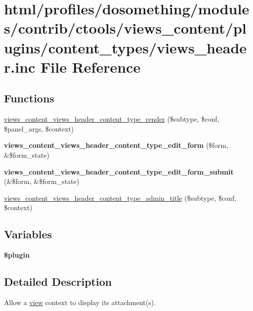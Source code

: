 \hypertarget{views__header_8inc}{
\section{html/profiles/dosomething/modules/contrib/ctools/views\_\-content/plugins/content\_\-types/views\_\-header.inc File Reference}
\label{views__header_8inc}
}
\subsection*{Functions}
\begin{DoxyCompactItemize}
\item 
\hyperlink{views__header_8inc_a7fe3f76daf36a922a0b8a45d68091f54}{views\_\-content\_\-views\_\-header\_\-content\_\-type\_\-render} (\$subtype, \$conf, \$panel\_\-args, \$context)
\item 
\hypertarget{views__header_8inc_aa9f0a2f5977f75a30de38c6b4d607998}{
{\bfseries views\_\-content\_\-views\_\-header\_\-content\_\-type\_\-edit\_\-form} (\$form, \&\$form\_\-state)}
\label{views__header_8inc_aa9f0a2f5977f75a30de38c6b4d607998}

\item 
\hypertarget{views__header_8inc_afe2df5d37309d0c73ef7b0b1d03860bd}{
{\bfseries views\_\-content\_\-views\_\-header\_\-content\_\-type\_\-edit\_\-form\_\-submit} (\&\$form, \&\$form\_\-state)}
\label{views__header_8inc_afe2df5d37309d0c73ef7b0b1d03860bd}

\item 
\hyperlink{views__header_8inc_aa2c11f517a4685017461c36dba11523c}{views\_\-content\_\-views\_\-header\_\-content\_\-type\_\-admin\_\-title} (\$subtype, \$conf, \$context)
\end{DoxyCompactItemize}
\subsection*{Variables}
\begin{DoxyCompactItemize}
\item 
{\bfseries \$plugin}
\end{DoxyCompactItemize}


\subsection{Detailed Description}
Allow a \hyperlink{classview}{view} context to display its attachment(s). 

